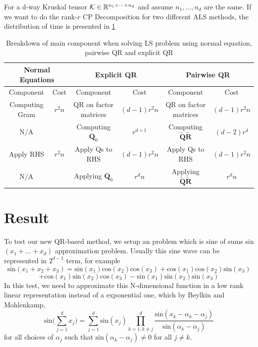 \documentclass{article}
\newcommand{\mat}[1]{\mathbf{#1}}
\newcommand{\T}[2][]{#1{\mathbf{\cal{#2}}}} 						%
\begin{document}
For a d-way Kruskal tensor $\T{K} \in \mathbb{R}^{n_1 \times \dots \times n_d}$ and assume $n_1, \dots , n_d$ are the same. 
If we want to do the rank-$r$ CP Decomposition for two different ALS methods, the distribution of time is presented in \cref{tab:its_parts}


\begin{table}[!ht]
  
  \centering
  \begin{tabular}{|c|c|c|c|c|c|}
    \hline
    \multicolumn{2}{|c|}{\textbf{Normal Equations}} & \multicolumn{2}{|c|}{\textbf{Explicit QR}} & \multicolumn{2}{|c|}{\textbf{Pairwise QR}} \\
    \hline
    Component & Cost & Component & Cost & Component & Cost \\
    \hline
    Computing Gram & $r^2n$&QR on factor matrices & $(d-1)r^2n$ & QR on factor matrices & $(d-1)r^2n$\\
    N/A& &Computing $\mat{Q}_0$ & $r^{d+1}$& Computing $\tilde{\mat{Q}}\tilde{\mat{R}}$& $(d-2)r^4$\\
    Apply RHS&  $r^2n$&Apply Qs to RHS & $(d-1)r^2n$ & Apply Qs to RHS& $(d-1)r^2n$ \\
    N/A & &Applying $\mat{Q}_0$& $r^dn$& Applying $\tilde{\mat{Q}}\tilde{\mat{R}}$& $r^dn$\\
     \hline
  \end{tabular}
  \caption{Breakdown of main component when solving LS problem using normal equation, pairwise QR and explicit QR}
  \label{tab:its_parts}
  \end{table}

  




\section{Result}
To test our new QR-based method, we setup an problem which is sine of sums sin$(x_1+\dots+ x_d)$ approximation problem.
Usually this sine wave can be represented in $2^{d-1}$ term, for example
$$\text{sin}(x_1+x_2+x_3) = \text{sin}(x_1)\text{cos}(x_2)\text{cos}(x_3)+\text{cos}(x_1)\text{cos}(x_2)\text{sin}(x_3)$$
$$+\text{cos}(x_1)\text{sin}(x_2)\text{cos}(x_3) - \text{sin}(x_1)\text{sin}(x_2)\text{sin}(x_3)$$
In this test, we need to approximate this N-dimensional function in a low rank linear representation instead of a exponential one, which by Beylkin and Mohlenkamp,
$$\text{sin}\bigl(\sum^d_{j=1}x_j\bigr) = \sum^d_{j=1}\text{sin}(x_j)\prod^d_{k=1,k\neq j}\frac{\text{sin}(x_k - \alpha_k -\alpha_j)}{\text{sin}(\alpha_k - \alpha_j)}$$
for all choices of  ${\alpha_j}$ such that $\text{sin}(\alpha_k - \alpha_j) \neq 0$ for all $j \neq k$.
\end{document}
